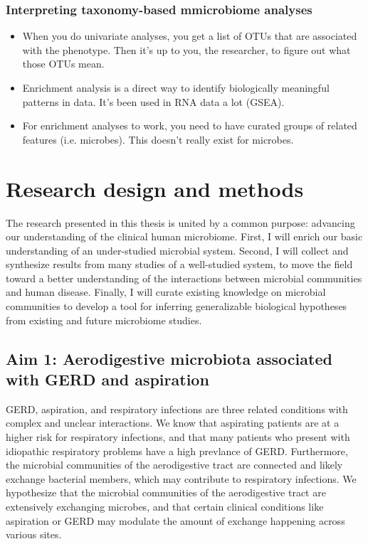 \documentclass[12pt]{article}
\begin{document}
\subsubsection{Interpreting taxonomy-based mmicrobiome analyses}\label{sec:gsea}
\begin{itemize}
\item When you do univariate analyses, you get a list of OTUs that are associated with the phenotype. Then it's up to you, the researcher, to figure out what those OTUs mean.
\item Enrichment analysis is a direct way to identify biologically meaningful patterns in data. It's been used in RNA data a lot (GSEA). 
\item For enrichment analyses to work, you need to have curated groups of related features (i.e. microbes). This doesn't really exist for microbes.
\end{itemize}

\section{Research design and methods}

The research presented in this thesis is united by a common purpose: 
advancing our understanding of the clinical human microbiome.
First, I will enrich our basic understanding of an under-studied 
microbial system. Second, I will collect and synthesize 
results from many studies of a well-studied system, to move the 
field toward a better understanding of the interactions between 
microbial communities and human disease. Finally, I will curate
existing knowledge on microbial communities to develop a tool for 
inferring generalizable biological hypotheses from existing and future microbiome studies.

\subsection{Aim 1: Aerodigestive microbiota associated with GERD and aspiration}

GERD, aspiration, and respiratory infections are three related
conditions with complex and unclear interactions.
We know that aspirating patients are at a higher risk for respiratory
infections, and that many patients who present with idiopathic
respiratory problems have a high prevlance of GERD. 
Furthermore, the microbial communities of the aerodigestive tract
are connected and likely exchange bacterial members, which may
contribute to respiratory infections. We hypothesize that the
microbial communities of the aerodigestive tract are extensively
exchanging microbes, and that certain clinical conditions like aspiration
or GERD may modulate the amount of exchange happening across various sites.
\end{document}
